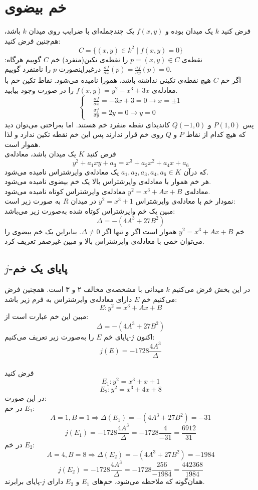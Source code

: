 \chapter{خم بیضوی}
فرض کنید
$k$
یک میدان بوده و 
$f(x,y)$
یک چندجمله‌ای با ضرایب روی میدان
$k$
باشد، هم‌چنین فرض کنید:
$$C = \{ (x,y) \in k^2 \mid f(x,y) = 0 \}$$
نقطه‌ی 
$p=(x,y) \in C$
را نقطه‌ی تکین(منفرد) خم 
$C$
گوییم هرگاه:
$\frac{\sigma f}{\sigma x} (p) = \frac{\sigma f}{\sigma y} (p) = 0 $
درغیراینصورت 
$p$
را نامنفرد گوییم.
\\
اگر خم
$C$
هیچ نقطه‌ی تکینی نداشته باشد، همورا نامیده می‌شود.
\example
نقاط تکین خم با معادله‌ی
$f(x,y) = y^2 - x^3 + 3x$
را در صورت وجود بیابید.
\\
\begin{equation*}
\begin{cases}
&\frac{\sigma f}{\sigma x} = -3x+3=0 \longrightarrow x = \pm 1 \\
&\frac{\sigma f}{\sigma y} = 2y=0 \longrightarrow y=0 
\end{cases}
\end{equation*}
پس 
$P(1,0)$
و
$Q(-1,0)$
کاندیدای نقطه‌ منفرد خم هستند. اما به‌راحتی می‌توان دید که هیچ کدام از نقاط
$P$
و
$Q$
روی خم قرار ندارند پس این خم نقطه تکین ندارد و لذا هموار است.
\\
فرض کنید
$K$
یک میدان باشد، معادله‌ی
$$ y^2 + a_1xy + a_3 = x^3 + a_2x^2 + a_4x+a_6 $$
که درآن
$a_1,a_2,a_3,a_4,a_6 \in K$
یک معادله‌ی وایرشتراس نامیده می‌شود.
\\
هر خم هموار با معادله‌ی وایرشتراس بالا یک خم بیضوی نامیده می‌شود.
\\
معادله‌ی
$y^2 = x^3+Ax+B$
معادله‌ی وایرشتراس کوتاه نامیده می‌شود.
\\
نمودار خم با معادله‌ی وایرشتراس
$y^2 = x^3+1$
در میدان
$R$
به صورت زیر است:
\\
مبین یک خم وایرشتراس کوتاه شده به‌صورت زیر می‌باشد:
$$\Delta = -(4A^3+27B^2)$$
\remark
خم
$y^2 = x^3+Ax+B$
هموار است اگر و تنها اگر 
$\Delta \ne 0$.
بنابراین یک خم بیضوی را می‌توان خمی با معادله‌ی وایرشتراس بالا و مبین غیرصفر تعریف کرد.
\section{
$j$-پایای یک خم
}
در این بخش فرض می‌کنیم 
$k$
میدانی با مشخصه‌ی مخالف ۲ و ۳ است. همچنین فرض می‌کنیم خم
$E$
دارای معادله‌ی وایرشتراس به فرم زیر باشد:
$$E:y^2=x^3+Ax+B$$
مبین این خم عبارت است از:
$$ \Delta = -(4A^3+27B^2) $$
اکنون $j$-پایای خم
$E$
را به‌صورت زیر تعریف می‌کنیم:
$$ j(E) = -1728\frac{4A^3}{\Delta} $$
\\
\example
فرض کنید
$$ E_1 : y^2 = x^3+x+1 $$
$$ E_2: y^2=x^3+4x+8 $$
در این صورت:
\\
در خم
$E_1$:
$$A=1,B=1 \Longrightarrow \Delta(E_1) = -(4A^3+27B^2) = -31 $$
$$ j(E_1)=-1728\frac{4A^3}{\Delta} = -1728\frac{4}{-31} = \frac{6912}{31} $$
در خم
$E_2$:
$$A=4,B=8 \Longrightarrow \Delta(E_2) = -(4A^3+27B^2) = -1984 $$
$$ j(E_2)=-1728\frac{4A^3}{\Delta} = -1728\frac{256}{-1984} = \frac{442368}{1984} $$
همان‌گونه که ملاحظه می‌شود، خم‌های 
$E_1$
و
$E_2$
دارای
$j$-پایای برابرند.
